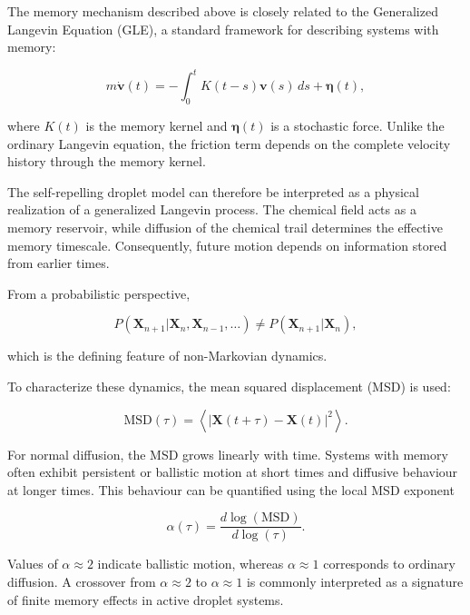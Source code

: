 The memory mechanism described above is closely related to the
Generalized Langevin Equation (GLE)\cite{balakrishnan2021}, a standard framework for describing
systems with memory:

\begin{equation}
m\dot{\mathbf{v}}(t)
=
-\int_0^t K(t-s)\mathbf{v}(s)\,ds
+
\boldsymbol{\eta}(t),
\end{equation}

where $K(t)$ is the memory kernel and $\boldsymbol{\eta}(t)$ is a
stochastic force. Unlike the ordinary Langevin equation, the friction
term depends on the complete velocity history through the memory kernel.

The self-repelling droplet model can therefore be interpreted as a
physical realization of a generalized Langevin process. The chemical
field acts as a memory reservoir, while diffusion of the chemical trail
determines the effective memory timescale. Consequently, future motion
depends on information stored from earlier times.

From a probabilistic perspective\cite{schutz2004},

\begin{equation}
P(\mathbf{X}_{n+1}|\mathbf{X}_n,\mathbf{X}_{n-1},\ldots)
\neq
P(\mathbf{X}_{n+1}|\mathbf{X}_n),
\end{equation}

which is the defining feature of non-Markovian dynamics.

To characterize these dynamics, the mean squared displacement (MSD)\cite{balakrishnan2021} is
used:

\begin{equation}
\mathrm{MSD}(\tau)
=
\left\langle
\left|
\mathbf{X}(t+\tau)-\mathbf{X}(t)
\right|^2
\right\rangle.
\end{equation}

For normal diffusion, the MSD grows linearly with time. Systems with
memory often exhibit persistent or ballistic motion at short times and
diffusive behaviour at longer times. This behaviour can be quantified
using the local MSD exponent\cite{balakrishnan2021}

\begin{equation}
\alpha(\tau)
=
\frac{d\log(\mathrm{MSD})}
     {d\log(\tau)}.
\end{equation}

Values of $\alpha \approx 2$ indicate ballistic motion, whereas
$\alpha \approx 1$ corresponds to ordinary diffusion. A crossover from
$\alpha \approx 2$ to $\alpha \approx 1$ is commonly interpreted as a
signature of finite memory effects in active droplet systems\cite{balakrishnan2021,droplet2025}.
